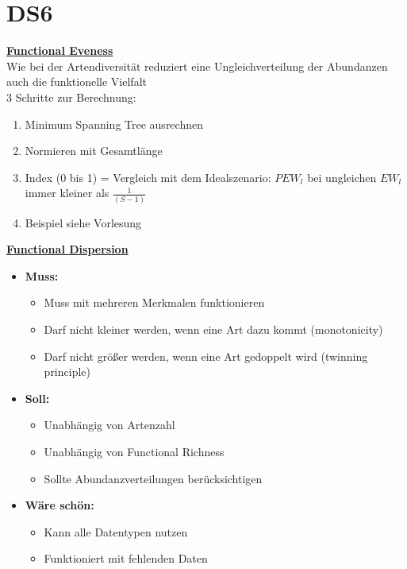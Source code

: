 \section{DS6}
\underline{\textbf{Functional Eveness}}\\
Wie bei der Artendiversität reduziert eine Ungleichverteilung der Abundanzen auch die funktionelle Vielfalt\\
3 Schritte zur Berechnung:
\begin{enumerate}
	\item Minimum Spanning Tree ausrechnen
	\item Normieren mit Gesamtlänge
	\item Index (0 bis 1) = Vergleich mit dem Idealszenario: $PEW_l$ bei ungleichen $EW_l$ immer kleiner als $\frac{1}{(S-1)}$
	\item Beispiel siehe Vorlesung
\end{enumerate}

\underline{\textbf{Functional Dispersion}}
\begin{itemize}
	\item \textbf{Muss:}
	\begin{itemize}
		\item Muss mit mehreren Merkmalen funktionieren
		\item Darf nicht kleiner werden, wenn eine Art dazu kommt (monotonicity)
		\item Darf nicht größer werden, wenn eine Art gedoppelt wird (twinning principle)
	\end{itemize}
	\item \textbf{Soll:}
	\begin{itemize}
		\item Unabhängig von Artenzahl
		\item Unabhängig von Functional Richness
		\item Sollte Abundanzverteilungen berücksichtigen
	\end{itemize}
	\item \textbf{Wäre schön:}
	\begin{itemize}
		\item Kann alle Datentypen nutzen
		\item Funktioniert mit fehlenden Daten
	\end{itemize}
\end{itemize}

